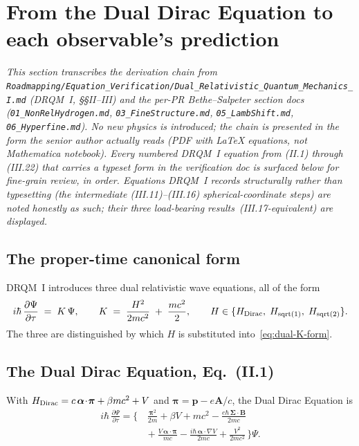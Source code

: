 \section{From the Dual Dirac Equation to each observable's prediction}
\label{sec:derivation-chain}

\noindent\textit{This section transcribes the derivation chain from
\texttt{Roadmapping/Equation\_Verification/Dual\_Relativistic\_Quantum\_Mechanics\_I.md}
(DRQM~I, \S\S II--III) and the per-PR Bethe--Salpeter section docs
(\texttt{01\_NonRelHydrogen.md}, \texttt{03\_FineStructure.md},
\texttt{05\_LambShift.md}, \texttt{06\_Hyperfine.md}). No new physics is
introduced; the chain is presented in the form the senior author actually
reads (PDF with LaTeX equations, not Mathematica notebook). Every
numbered DRQM~I equation from (II.1) through (III.22) that carries a
typeset form in the verification doc is surfaced below for fine-grain
review, in order. Equations DRQM~I records structurally rather than
typesetting (the intermediate (III.11)--(III.16) spherical-coordinate steps)
are noted honestly as such; their three load-bearing
results~(III.17-equivalent) are displayed.}

\subsection{The proper-time canonical form}

DRQM~I introduces three dual relativistic wave equations, all of the form
\begin{equation}
\label{eq:dual-K-form}
i\hbar\,\frac{\partial\Psi}{\partial\tau} \;=\; K\,\Psi,\qquad
K \;=\; \frac{H^2}{2 m c^2} \;+\; \frac{m c^2}{2},\qquad
H \in \{H_{\rm Dirac},\;H_{\rm sqrt(1)},\;H_{\rm sqrt(2)}\}.
\end{equation}
The three are distinguished by which $H$ is substituted into~\eqref{eq:dual-K-form}.

\subsection{The Dual Dirac Equation, Eq.~(II.1)}

With $H_{\rm Dirac} = c\,\boldsymbol\alpha\!\cdot\!\boldsymbol\pi
+ \beta m c^2 + V$ and $\boldsymbol\pi = \mathbf{p} - e\mathbf{A}/c$, the
Dual Dirac Equation is
\begin{equation}
\label{eq:II1-dual-dirac}
\begin{aligned}
i\hbar\,\frac{\partial\Psi}{\partial\tau} = \Bigg\{&\,
   \frac{\boldsymbol\pi^2}{2m}
 + \beta V
 + m c^2
 - \frac{e\hbar\,\boldsymbol\Sigma\!\cdot\!\mathbf{B}}{2 m c} \\
&{}+ \frac{V\,\boldsymbol\alpha\!\cdot\!\boldsymbol\pi}{m c}
 - \frac{i \hbar\,\boldsymbol\alpha\!\cdot\!\nabla V}{2 m c}
 + \frac{V^2}{2 m c^2}\,
\Bigg\}\Psi.
\end{aligned}
\end{equation}

